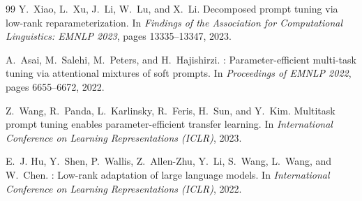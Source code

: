 \documentclass[12pt]{article}
\begin{document}
\begin{thebibliography}{99}
Y.~Xiao, L.~Xu, J.~Li, W.~Lu, and X.~Li.
\newblock Decomposed prompt tuning via low-rank reparameterization.
\newblock In \emph{Findings of the Association for Computational Linguistics: EMNLP
  2023}, pages 13335--13347, 2023.

A.~Asai, M.~Salehi, M.~Peters, and H.~Hajishirzi.
: Parameter-efficient multi-task tuning via attentional mixtures of
  soft prompts.
\newblock In \emph{Proceedings of EMNLP 2022}, pages 6655--6672, 2022.

Z.~Wang, R.~Panda, L.~Karlinsky, R.~Feris, H.~Sun, and Y.~Kim.
\newblock Multitask prompt tuning enables parameter-efficient transfer learning.
\newblock In \emph{International Conference on Learning Representations (ICLR)}, 2023.

E.~J. Hu, Y.~Shen, P.~Wallis, Z.~Allen-Zhu, Y.~Li, S.~Wang, L.~Wang, and W.~Chen.
: Low-rank adaptation of large language models.
\newblock In \emph{International Conference on Learning Representations (ICLR)}, 2022.

\end{thebibliography}
\end{document}
